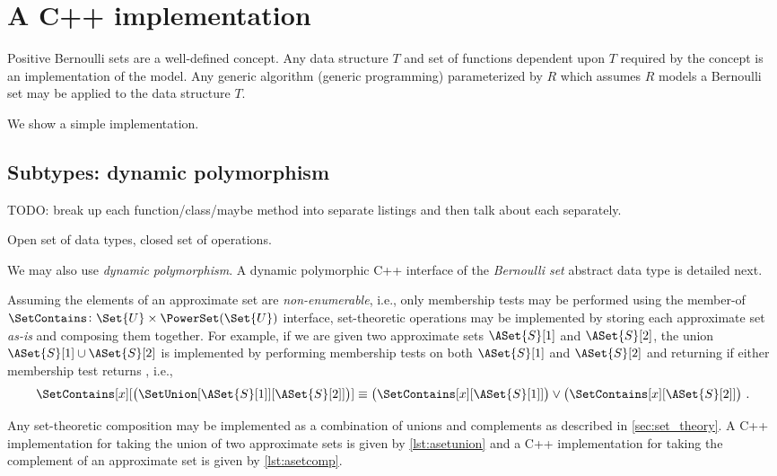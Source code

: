 \documentclass[ ../main.tex]{subfiles}
\begin{document}
\section{A C++ implementation}
\label{sec:impl}
Positive Bernoulli sets are a well-defined concept. Any data structure $T$ and set of functions dependent upon $T$ required by the concept is an implementation of the model.
Any generic algorithm (generic programming) parameterized by $R$ which assumes $R$ models a Bernoulli set may be applied to the data structure $T$.

We show a simple implementation.

\subsection{Subtypes: dynamic polymorphism}
TODO: break up each function/class/maybe method into separate listings and then
talk about each separately.

Open set of data types, closed set of operations.

We may also use \emph{dynamic polymorphism}. A dynamic polymorphic C++
interface of the \emph{Bernoulli set} abstract data type is detailed next.


Assuming the elements of an approximate set are \emph{non-enumerable}, i.e., only membership tests may be performed using the member-of $\SetContains \colon \Set{U} \times \PowerSet(\Set{U})$ interface, set-theoretic operations may be implemented by storing each approximate set \emph{as-is} and composing them together. For example, if we are given two approximate sets $\ASet{S}[1]$ and $\ASet{S}[2]$, the union $\ASet{S}[1] \cup \ASet{S}[2]$ is implemented by performing membership tests on both $\ASet{S}[1]$ and $\ASet{S}[2]$ and returning \True if either membership test returns \True, i.e.,
\begin{equation}
\SetContains[x][\left(\SetUnion[\ASet{S}[1]][\ASet{S}[2]]\right)] \equiv \left(\SetContains[x][\ASet{S}[1]]\right) \lor \left(\SetContains[x][\ASet{S}[2]]\right)\,.
\end{equation}

Any set-theoretic composition may be implemented as a combination of unions and complements as described in \cref{sec:set_theory}. A C++ implementation for taking the union of two approximate sets is given by \cref{lst:asetunion} and a C++ implementation for taking the complement of an approximate set is given by \cref{lst:asetcomp}.
\end{document}

